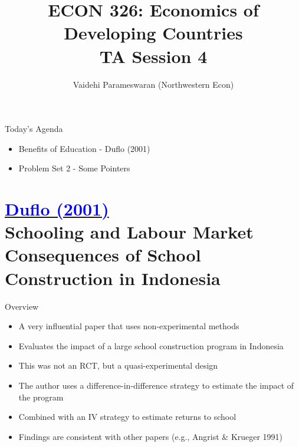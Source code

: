 \documentclass[11pt,notes=hide,aspectratio=169,mathserif]{beamer}
\title[class]{ECON 326: Economics of Developing Countries \\ TA Session 4}
\author[vaidehi's class ]{Vaidehi Parameswaran (Northwestern Econ)}
\date{\monthname[\the\month] \the\year}
\begin{document}
\begin{frame}[plain]
\titlepage
\end{frame}


\begin{frame}{Today's Agenda}

\begin{itemize}
\item Benefits of Education - Duflo (2001)
\item Problem Set 2 - Some Pointers 
\end{itemize}
\end{frame}



\section*{\href{https://www.aeaweb.org/articles?id=10.1257/0002828041302109}{\textcolor{blue}{Duflo (2001)}} \\[5mm] 
\textnormal{\small{Schooling and Labour Market Consequences of School Construction in Indonesia}}}

\begin{frame}{Overview}
\begin{itemize}
\item A very influential paper that uses non-experimental methods 
\item Evaluates the impact of a large school construction program in Indonesia
\item This was not an RCT, but a quasi-experimental design
\item The author uses a difference-in-difference strategy to estimate the impact of the program
\item Combined with an IV strategy to estimate returns to school
\item Findings are consistent with other papers (e.g., Angrist \& Krueger 1991)
\end{itemize}
\end{frame}
\end{document}
